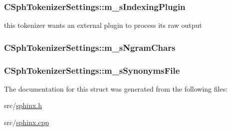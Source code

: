 \hypertarget{structCSphTokenizerSettings_acd1d422d8233b67fd998c25ab55d8d18}{
\subsubsection[{m\-\_\-s\-Indexing\-Plugin}]{ C\-Sph\-Tokenizer\-Settings\-::m\-\_\-s\-Indexing\-Plugin}}\label{structCSphTokenizerSettings_acd1d422d8233b67fd998c25ab55d8d18}


this tokenizer wants an external plugin to process its raw output 

\hypertarget{structCSphTokenizerSettings_a84c63750d9a9ac4ed84feb70ae0c6567}{
\subsubsection[{m\-\_\-s\-Ngram\-Chars}]{ C\-Sph\-Tokenizer\-Settings\-::m\-\_\-s\-Ngram\-Chars}}\label{structCSphTokenizerSettings_a84c63750d9a9ac4ed84feb70ae0c6567}
\hypertarget{structCSphTokenizerSettings_a1b4bf3e68597390f3ae77a7b9dd0a215}{
\subsubsection[{m\-\_\-s\-Synonyms\-File}]{ C\-Sph\-Tokenizer\-Settings\-::m\-\_\-s\-Synonyms\-File}}\label{structCSphTokenizerSettings_a1b4bf3e68597390f3ae77a7b9dd0a215}


The documentation for this struct was generated from the following files\-:\begin{DoxyCompactItemize}
\item 
src/\hyperlink{sphinx_8h}{sphinx.\-h}\item 
src/\hyperlink{sphinx_8cpp}{sphinx.\-cpp}\end{DoxyCompactItemize}
